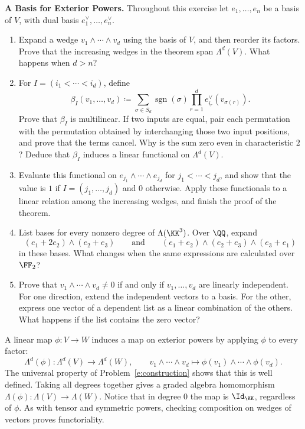 \documentclass[12pt,reqno]{amsart}
\DeclareMathOperator{\sgn}{sgn}
\begin{document}
\begin{problems}
\item\label{e:basis} \textbf{A Basis for Exterior Powers.} Throughout this exercise let $e_1,\ldots,e_n$ be a basis of $V$, with dual basis $e_1^{\vee},\ldots,e_n^{\vee}$.
\begin{enumerate}
\item Expand a wedge $v_1\wedge\cdots\wedge v_d$ using the basis of $V$, and then reorder its factors. Prove that the increasing wedges in the theorem span $\Lambda^d(V)$. What happens when $d>n$?
\item For $I=(i_1<\cdots<i_d)$, define
\[
\beta_I(v_1,\ldots,v_d)\coloneqq\sum_{\sigma\in S_d}\sgn(\sigma)\prod_{r=1}^de_{i_r}^{\vee}(v_{\sigma(r)}).
\]
Prove that $\beta_I$ is multilinear. If two inputs are equal, pair each permutation with the permutation obtained by interchanging those two input positions, and prove that the terms cancel. Why is the sum zero even in characteristic $2$? Deduce that $\beta_I$ induces a linear functional on $\Lambda^d(V)$.
\item Evaluate this functional on $e_{j_1}\wedge\cdots\wedge e_{j_d}$ for $j_1<\cdots<j_d$, and show that the value is $1$ if $I=(j_1,\ldots,j_d)$ and $0$ otherwise. Apply these functionals to a linear relation among the increasing wedges, and finish the proof of the theorem.
\item List bases for every nonzero degree of $\Lambda(\KK^3)$. Over $\QQ$, expand
\[
(e_1+2e_2)\wedge(e_2+e_3)\qquad\text{and}\qquad(e_1+e_2)\wedge(e_2+e_3)\wedge(e_3+e_1)
\]
in these bases. What changes when the same expressions are calculated over $\FF_2$?
\item Prove that $v_1\wedge\cdots\wedge v_d\ne0$ if and only if $v_1,\ldots,v_d$ are linearly independent. For one direction, extend the independent vectors to a basis. For the other, express one vector of a dependent list as a linear combination of the others. What happens if the list contains the zero vector?
\end{enumerate}
\end{problems}

\hrulefill

A linear map $\phi:V\to W$ induces a map on exterior powers by applying $\phi$ to every factor:
\[
\Lambda^d(\phi):\Lambda^d(V)\longrightarrow\Lambda^d(W),\qquad v_1\wedge\cdots\wedge v_d\longmapsto\phi(v_1)\wedge\cdots\wedge\phi(v_d).
\]
The universal property of Problem~\ref{e:construction} shows that this is well defined. Taking all degrees together gives a graded algebra homomorphism $\Lambda(\phi):\Lambda(V)\to\Lambda(W)$. Notice that in degree $0$ the map is $\Id_{\KK}$, regardless of $\phi$. As with tensor and symmetric powers, checking composition on wedges of vectors proves functoriality.
\end{document}
